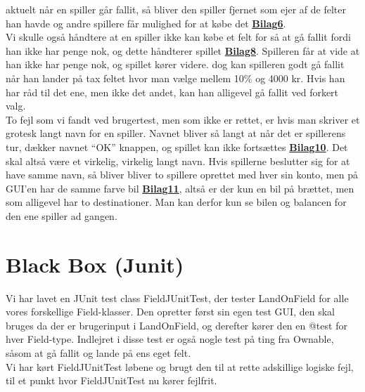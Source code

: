 aktuelt når en spiller går fallit, så bliver den spiller fjernet som ejer af de
felter han havde og andre spillere får mulighed for at købe det
\textbf{\hyperref[bilag6]{Bilag6}}.\\
\indent Vi skulle også håndtere at en spiller ikke kan købe et felt for så at gå
fallit fordi han ikke har penge nok, og dette håndterer spillet
\textbf{\hyperref[bilag8]{Bilag8}}.
Spilleren får at vide at han ikke har penge nok, og spillet kører videre. dog
kan spilleren godt gå fallit når han lander på tax feltet hvor man vælge mellem
10\% og 4000 kr. Hvis han har råd til det ene, men ikke det andet, kan han
alligevel gå fallit ved forkert valg.\\
\indent To fejl som vi fandt ved brugertest, men som ikke er rettet, er hvis man 
skriver et grotesk langt navn for en spiller. Navnet bliver så langt at når det er
spillerens tur, dækker navnet “OK” knappen, og spillet kan ikke fortsættes
\textbf{\hyperref[bilag10]{Bilag10}}. Det skal altså være et virkelig, virkelig
langt navn. Hvis spillerne beslutter sig for at have samme navn, så bliver bliver to spillere
oprettet med hver sin konto, men på GUI’en har de samme farve bil
\textbf{\hyperref[bilag11]{Bilag11}}, altså er der kun en bil på brættet, men
som alligevel har to destinationer. Man kan derfor kun se bilen og balancen for den
ene spiller ad gangen.
\section*{Black Box (Junit)}
Vi har lavet en JUnit test class FieldJUnitTest, der tester LandOnField for alle
vores forskellige Field-klasser. Den opretter først sin egen test GUI, den skal
bruges da der er brugerinput i LandOnField, og derefter kører den en @test for
hver Field-type. Indlejret i disse test er også nogle test på ting fra Ownable,
såsom at gå fallit og lande på ens eget felt.\\
\indent Vi har kørt FieldJUnitTest løbene og brugt den til at rette adskillige
logiske fejl, til et punkt hvor FieldJUnitTest nu kører fejlfrit.
